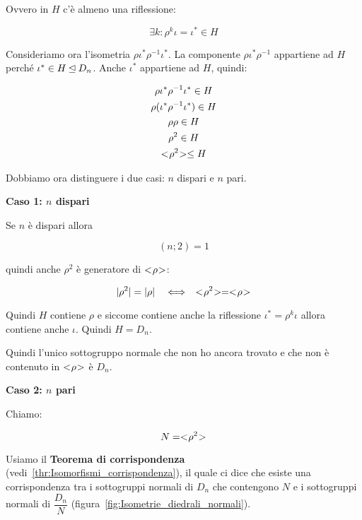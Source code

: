 	Ovvero in $H$ c'è almeno una riflessione:
	
	\begin{equation}
		\exists k : \rho^k \iota = \iota^* \in H
	\end{equation}

	Consideriamo ora l'isometria $\rho \iota^* \rho^{-1} \iota^*$. La componente $\rho \iota^* \rho^{-1}$ appartiene ad $H$ perché $\iota^* \in H \unlhd D_n$. Anche $\iota^*$ appartiene ad $H$, quindi:
	
	\begin{gather}
		\rho \iota^* \rho^{-1} \iota^* \in H \\
		\rho (\iota^* \rho^{-1} \iota^*) \in H \\
		\rho \rho \in H \\
		\rho^2 \in H \\
		< \negmedspace \rho^2 \negmedspace > \le H
	\end{gather}

	Dobbiamo ora distinguere i due casi: $n$ dispari e $n$ pari.
	
	\textbf{Caso 1: $n$ dispari}
	
	Se $n$ è dispari allora
	
	\begin{equation}
		(n; 2) = 1
	\end{equation}

	quindi anche $\rho^2$ è generatore di $< \negmedspace \rho \negmedspace >$:
	
	\begin{equation}
		\lvert \rho^2 \rvert = \lvert \rho \rvert \quad\Longleftrightarrow\quad < \negmedspace \rho^2 \negmedspace > = < \negmedspace \rho \negmedspace >
	\end{equation}
	 
	Quindi $H$ contiene $\rho$ e siccome contiene anche la riflessione $\iota^* = \rho^k \iota$ allora contiene anche $\iota$. Quindi $H = D_n$.

	Quindi l'unico sottogruppo normale che non ho ancora trovato e che non è contenuto in $< \negmedspace \rho \negmedspace >$ è $D_n$. 

	\textbf{Caso 2: $n$ pari}

	Chiamo:
	
	\begin{equation}
		N = < \negmedspace \rho^2 \negmedspace >
	\end{equation}

	Usiamo il \textbf{Teorema di corrispondenza} (vedi~\ref{thr:Isomorfismi_corrispondenza}),
	il quale ci dice che esiste una corrispondenza tra i sottogruppi normali di $D_n$ che contengono $N$ e i sottogruppi normali di $\dfrac{D_n}{N}$ (figura~\ref{fig:Isometrie_diedrali_normali}).
	
